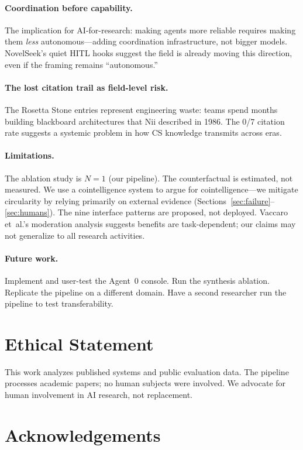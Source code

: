 \documentclass{article}
\begin{document}
\paragraph{Coordination before capability.}
The implication for AI-for-research: making agents more reliable requires
making them \emph{less} autonomous---adding coordination infrastructure,
not bigger models. NovelSeek's quiet HITL hooks suggest the field is
already moving this direction, even if the framing remains ``autonomous.''

\paragraph{The lost citation trail as field-level risk.}
The Rosetta Stone entries represent engineering waste: teams spend months
building blackboard architectures that Nii described in 1986. The 0/7
citation rate suggests a systemic problem in how CS knowledge transmits
across eras.

\paragraph{Limitations.}
The ablation study is $N\!=\!1$ (our pipeline). The counterfactual is
estimated, not measured. We use a cointelligence system to argue for
cointelligence---we mitigate circularity by relying primarily on
external evidence (Sections~\ref{sec:failure}--\ref{sec:humans}). The
nine interface patterns are proposed, not deployed. Vaccaro et~al.'s
moderation analysis suggests benefits are task-dependent; our claims may
not generalize to all research activities.

\paragraph{Future work.}
Implement and user-test the Agent~0 console. Run the synthesis ablation.
Replicate the pipeline on a different domain. Have a second researcher
run the pipeline to test transferability.


\section*{Ethical Statement}

This work analyzes published systems and public evaluation data. The
pipeline processes academic papers; no human subjects were involved. We
advocate for human involvement in AI research, not replacement.


\section*{Acknowledgements}





\end{document}
